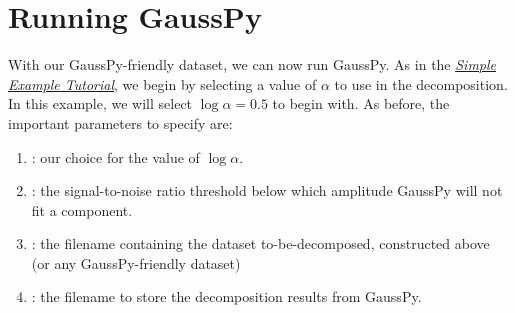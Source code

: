 \documentclass[letterpaper,10pt,openany,oneside]{sphinxmanual}
\begin{document}
\section{Running GaussPy}
\label{tutorial:id4}
With our GaussPy-friendly dataset, we can now run GaussPy. As in the
{\hyperref[tutorial:simple\string-example\string-tutorial]{\emph{Simple Example Tutorial}}}, we begin by selecting a value of \(\alpha\)
to use in the decomposition. In this example, we will select \(\log\alpha=0.5\) to
begin with. As before, the important parameters to specify are:
\begin{enumerate}
\item {} 
: our choice for the value of \(\log\alpha\).

\item {} 
: the signal-to-noise ratio threshold below which amplitude
GaussPy will not fit a component.

\item {} 
: the filename containing the dataset to-be-decomposed,
constructed above (or any GaussPy-friendly dataset)

\item {} 
: the filename to store the decomposition results from
GaussPy.

\end{enumerate}
\end{document}
